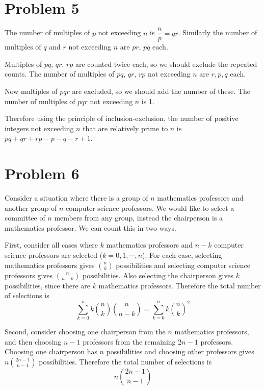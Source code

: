 \documentclass[10pt]{article}
\begin{document}
\section*{Problem 5}

The number of multiples of $p$ not exceeding $n$ is $\dfrac{n}{p} = qr$.
Similarly the number of multiples of $q$ and $r$ not exceeding $n$ are $pr$, $pq$ each.

\vspace{3mm}
Multiples of $pq$, $qr$, $rp$ are counted twice each, so we should exclude the repeated counts.
The number of multiples of $pq$, $qr$, $rp$ not exceeding $n$ are $r, p, q$ each.

\vspace{3mm}
Now multiples of $pqr$ are excluded, so we should add the number of these.
The number of multiples of $pqr$ not exceeding $n$ is 1.

\vspace{3mm}
Therefore using the principle of inclusion-exclusion, the number of positive integers not exceeding $n$ that are relatively prime to $n$ is $pq + qr + rp - p - q - r + 1$.

\section*{Problem 6}
Consider a situation where there is a group of $n$ mathematics professors and another group of $n$ computer science professors.
We would like to select a committee of $n$ members from any group, instead the chairperson is a mathematics professor.
We can count this in two ways.

\vspace{3mm}
First, consider all cases where $k$ mathematics professors and $n-k$ computer science professors are selected ($k = 0, 1, \cdots, n$).
For each case, selecting mathematics professors gives ${n \choose k}$ possibilities and selecting computer science professors gives ${n \choose n-k}$ possibilities. Also selecting the chairperson gives $k$ possibilities, since there are $k$ mathematics professors.
Therefore the total number of selections is 
$$\sum_{k=0}^{n}k{n \choose k}{n \choose n - k} = \sum_{k=0}^{n}k{n \choose k}^2$$

\vspace{3mm}
Second, consider choosing one chairperson from the $n$ mathematics professors, and then choosing $n-1$ professors from the remaining $2n-1$ professors.
Choosing one chairperson has $n$ possibilities and choosing other professors gives $n{2n-1 \choose n-1}$ possibilities.
Therefore the total number of selections is 
$$n{2n-1 \choose n-1}$$
\end{document}
